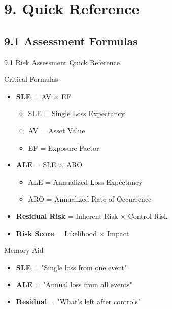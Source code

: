 \documentclass[9pt]{beamer}  %
\begin{document}
	\section{9. Quick Reference}
	
	\subsection{9.1 Assessment Formulas}
	\begin{frame}{9.1 Risk Assessment Quick Reference}
		\begin{block}{Critical Formulas}
			\begin{itemize}
				\item \textbf{SLE} = AV × EF
				\begin{itemize}
					\item SLE = Single Loss Expectancy
					\item AV = Asset Value
					\item EF = Exposure Factor
				\end{itemize}
				\item \textbf{ALE} = SLE × ARO
				\begin{itemize}
					\item ALE = Annualized Loss Expectancy
					\item ARO = Annualized Rate of Occurrence
				\end{itemize}
				\item \textbf{Residual Risk} = Inherent Risk × Control Risk
				\item \textbf{Risk Score} = Likelihood × Impact
			\end{itemize}
		\end{block}
		
		\begin{exampleblock}{Memory Aid}
			\begin{itemize}
				\item \textbf{SLE} = "Single loss from one event"
				\item \textbf{ALE} = "Annual loss from all events"
				\item \textbf{Residual} = "What's left after controls"
			\end{itemize}
		\end{exampleblock}
	\end{frame}
	
\end{document}
